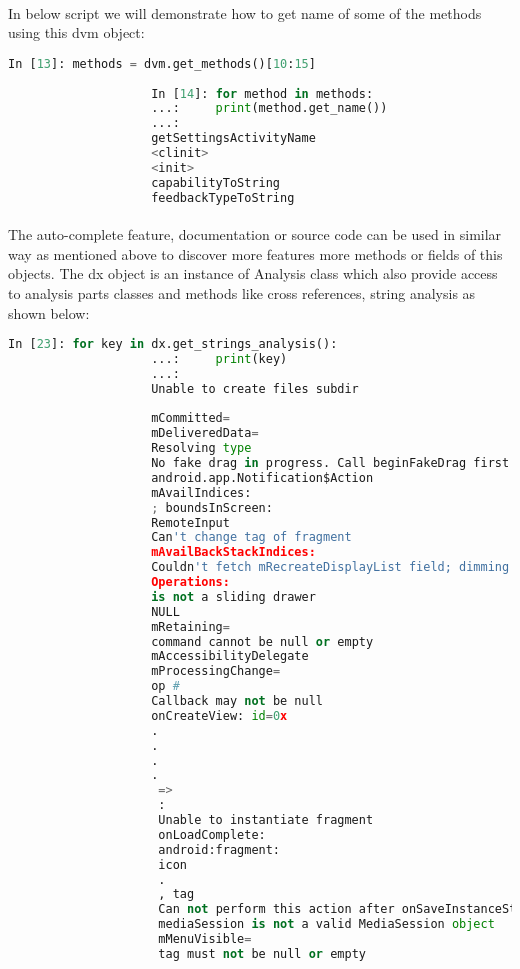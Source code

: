 \documentclass[../main.tex]{subfile}
\begin{document}
			\paragraph{} In below script we will demonstrate how to get name of some of the methods using this dvm object:
				\begin{lstlisting}[language=python]
					In [13]: methods = dvm.get_methods()[10:15]
					
					In [14]: for method in methods:
					...:     print(method.get_name())
					...:     
					getSettingsActivityName
					<clinit>
					<init>
					capabilityToString
					feedbackTypeToString
				\end{lstlisting}
				
			\paragraph{} The auto-complete feature, documentation or source code can be used in similar way as mentioned above to discover more features more methods or fields of this objects. The dx object is an instance of Analysis class which also provide access to analysis parts classes and methods like cross references, string analysis as shown below:
				\begin{lstlisting}[language=python]
					In [23]: for key in dx.get_strings_analysis():
					...:     print(key)
					...:     
					Unable to create files subdir 
					
					mCommitted=
					mDeliveredData=
					Resolving type 
					No fake drag in progress. Call beginFakeDrag first.
					android.app.Notification$Action
					mAvailIndices: 
					; boundsInScreen: 
					RemoteInput
					Can't change tag of fragment 
					mAvailBackStackIndices: 
					Couldn't fetch mRecreateDisplayList field; dimming will be slow.
					Operations:
					is not a sliding drawer
					NULL
					mRetaining=
					command cannot be null or empty
					mAccessibilityDelegate
					mProcessingChange=
					op #
					Callback may not be null
					onCreateView: id=0x
					.
					.
					.
					.
					 => 
					 : 
					 Unable to instantiate fragment 
					 onLoadComplete: 
					 android:fragment:
					 icon
					 .
					 , tag 
					 Can not perform this action after onSaveInstanceState
					 mediaSession is not a valid MediaSession object
					 mMenuVisible=
					 tag must not be null or empty
					 
				\end{lstlisting}
\end{document}
